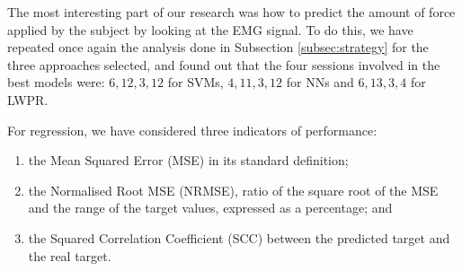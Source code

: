 The most interesting part of our research was how to predict the
amount of force applied by the subject by looking at the EMG
signal. To do this, we have repeated once again the analysis done in
Subsection \ref{subsec:strategy} for the three approaches selected,
and found out that the four sessions involved in the best models were:
$6,12,3,12$ for SVMs, $4,11,3,12$ for NNs and $6,13,3,4$ for LWPR.

For regression, we have considered three indicators of performance:

\begin{enumerate}

  \item the Mean Squared Error (MSE) in its standard definition;

  \item the Normalised Root MSE (NRMSE), ratio of the square root of
    the MSE and the range of the target values, expressed as a
    percentage; and

  \item the Squared Correlation Coefficient (SCC) between the
    predicted target and the real target.

\end{enumerate}

